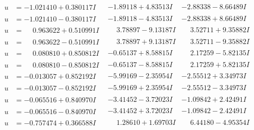 \documentclass[1p]{elsarticle_modified}
\theoremstyle{definition}
\begin{document}
$$\begin{array}{c|c|c}
\begin{aligned}
u &= -1.021410 + 0.380117 I\end{aligned}
 & -1.89118 + 4.83513 I & -2.88338 - 8.66489 I \\ \hline\begin{aligned}
u &= -1.021410 - 0.380117 I\end{aligned}
 & -1.89118 - 4.83513 I & -2.88338 + 8.66489 I \\ \hline\begin{aligned}
u &= \phantom{-}0.963622 + 0.510991 I\end{aligned}
 & \phantom{-}3.78897 - 9.13187 I & \phantom{-}3.52711 + 9.35882 I \\ \hline\begin{aligned}
u &= \phantom{-}0.963622 - 0.510991 I\end{aligned}
 & \phantom{-}3.78897 + 9.13187 I & \phantom{-}3.52711 - 9.35882 I \\ \hline\begin{aligned}
u &= \phantom{-}0.080810 + 0.850812 I\end{aligned}
 & -0.65137 + 8.58815 I & \phantom{-}2.17259 - 5.82135 I \\ \hline\begin{aligned}
u &= \phantom{-}0.080810 - 0.850812 I\end{aligned}
 & -0.65137 - 8.58815 I & \phantom{-}2.17259 + 5.82135 I \\ \hline\begin{aligned}
u &= -0.013057 + 0.852192 I\end{aligned}
 & -5.99169 - 2.35954 I & -2.55512 + 3.34973 I \\ \hline\begin{aligned}
u &= -0.013057 - 0.852192 I\end{aligned}
 & -5.99169 + 2.35954 I & -2.55512 - 3.34973 I \\ \hline\begin{aligned}
u &= -0.065516 + 0.840970 I\end{aligned}
 & -3.41452 - 3.72023 I & -1.09842 + 2.42491 I \\ \hline\begin{aligned}
u &= -0.065516 - 0.840970 I\end{aligned}
 & -3.41452 + 3.72023 I & -1.09842 - 2.42491 I \\ \hline\begin{aligned}
u &= -0.757474 + 0.366588 I\end{aligned}
 & \phantom{-}1.28610 + 1.69703 I & \phantom{-}6.44180 - 4.95354 I \\ \hline\begin{aligned}

\end{aligned}
\end{array}$$
\end{document}
